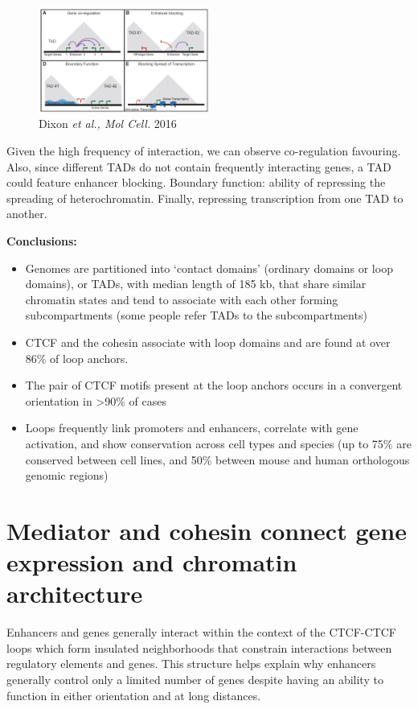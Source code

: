 \begin{figure}
\centering
\includegraphics[width=0.5\textwidth]{../_resources/Screenshot_2022-10-19_at_09-21-57.png}
\caption{Dixon \emph{et al., Mol Cell.} 2016}
\end{figure}

Given the high frequency of interaction, we can observe co-regulation favouring. Also, since different TADs do not contain frequently interacting genes, a TAD could feature enhancer blocking. Boundary function: ability of repressing the spreading of heterochromatin. Finally, repressing transcription from one TAD to another.

\textbf{Conclusions:}

\begin{itemize}
\tightlist
\item
  Genomes are partitioned into `contact domains' (ordinary domains or loop domains), or TADs, with median length of 185 kb, that share similar chromatin states and tend to associate with each other forming subcompartments (some people refer TADs to the subcompartments)
\item
  CTCF and the cohesin associate with loop domains and are found at over 86\% of loop anchors.
\item
  The pair of CTCF motifs present at the loop anchors occurs in a convergent orientation in \textgreater90\% of cases
\item
  Loops frequently link promoters and enhancers, correlate with gene activation, and show conservation across cell types and species (up to 75\% are conserved between cell lines, and 50\% between mouse and human orthologous genomic regions)
\end{itemize}

\section{Mediator and cohesin connect gene expression and chromatin architecture}

Enhancers and genes generally interact within the context of the CTCF-CTCF loops which form insulated neighborhoods that constrain interactions between regulatory elements and genes.
This structure helps explain why enhancers generally control only a limited number of genes despite having an ability to function in either orientation and at long distances.

